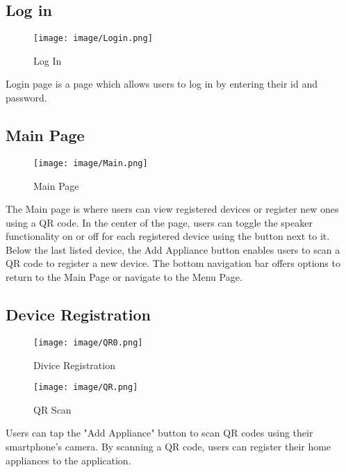\documentclass[conference]{IEEEtran}
\begin{document}
\subsection{Log in}
\begin{figure}[h!]
    \centering
    \texttt{[image: image/Login.png]}
    \caption{Log In}
    \label{fig:enter-label}
\end{figure}

\noindent Login page is a page which allows users to log in by entering their id and password.\\


\subsection{Main Page}

\begin{figure}[h!]
    \centering
    \texttt{[image: image/Main.png]}
    \caption{Main Page}
    \label{fig:enter-label}
\end{figure}

\noindent The Main page is where users can view registered devices or register new ones using a QR code. In the center of the page, users can toggle the speaker functionality on or off for each registered device using the button next to it. Below the last listed device, the Add Appliance button enables users to scan a QR code to register a new device. The bottom navigation bar offers options to return to the Main Page or navigate to the Menu Page.\\

\clearpage

\subsection{Device Registration}

\begin{figure}[h!]
    \centering
    \texttt{[image: image/QR0.png]}
    \caption{Divice Registration}
    \label{fig:enter-label}
\end{figure}

\begin{figure}[h!]
    \centering
    \texttt{[image: image/QR.png]}
    \caption{QR Scan}
    \label{fig:enter-label}
\end{figure}
\noindent Users can tap the "Add Appliance" button to scan QR codes using their smartphone's camera. By scanning a QR code, users can register their home appliances to the application.\\
\end{document}
